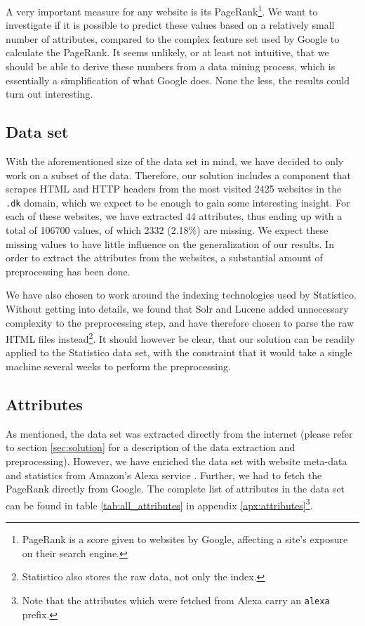 A very important measure for any website is its PageRank\footnote{PageRank is a score given to websites by Google, affecting a site's exposure on their search engine.}. We want to investigate if it is possible to predict these values based on a relatively small number of attributes, compared to the complex feature set used by Google to calculate the PageRank. It seems unlikely, or at least not intuitive, that we should be able to derive these numbers from a data mining process, which is essentially a simplification of what Google does. None the less, the results could turn out interesting.

\subsection{Data set}
\label{subsec:data_set}

With the aforementioned size of the data set in mind, we have decided to only work on a subset of the data. Therefore, our solution includes a component that scrapes HTML and HTTP headers from the most visited 2425 websites in the \texttt{.dk} domain, which we expect to be enough to gain some interesting insight. For each of these websites, we have extracted 44 attributes, thus ending up with a total of 106700 values, of which 2332 (2.18\%) are missing. We expect these missing values to have little influence on the generalization of our results. In order to extract the attributes from the websites, a substantial amount of preprocessing has been done.

We have also chosen to work around the indexing technologies used by Statistico. Without getting into details, we found that Solr and {Lucene} added unnecessary complexity to the preprocessing step, and have therefore chosen to parse the raw {HTML} files instead\footnote{Statistico also stores the raw data, not only the index.}. It should however be clear, that our solution can be readily applied to the Statistico data set, with the constraint that it would take a single machine several weeks to perform the preprocessing.

\subsection{Attributes}
\label{subsec:attributes}

As mentioned, the data set was extracted directly from the internet (please refer to section \ref{sec:solution} for a description of the data extraction and preprocessing). However, we have enriched the data set with website meta-data and statistics from Amazon's Alexa service \cite{alexa}. Further, we had to fetch the PageRank directly from Google. The complete list of attributes in the data set can be found in table \ref{tab:all_attributes} in appendix \ref{apx:attributes}\footnote{Note that the attributes which were fetched from Alexa carry an \texttt{alexa} prefix.}.

